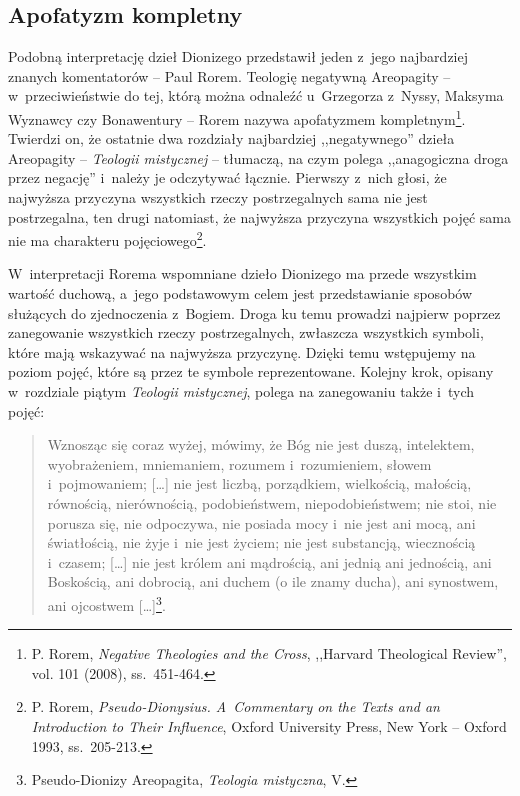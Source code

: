\subsection*{Apofatyzm kompletny}

Podobną interpretację dzieł Dionizego przedstawił jeden z~jego najbardziej znanych komentatorów -- Paul Rorem. Teologię negatywną Areopagity -- w~przeciwieństwie do tej, którą można odnaleźć u~Grzegorza z~Nyssy, Maksyma Wyznawcy czy Bonawentury -- Rorem nazywa apofatyzmem kompletnym\footnote{P. Rorem, \textit{Negative Theologies and the Cross}, ,,Harvard Theological Review'', vol. 101 (2008), ss.~451-464.}. Twierdzi on, że ostatnie dwa rozdziały najbardziej ,,negatywnego'' dzieła Areopagity -- \textit{Teologii mistycznej} -- tłumaczą, na czym polega ,,anagogiczna droga przez negację'' i~należy je odczytywać łącznie. Pierwszy z~nich głosi, że najwyższa przyczyna wszystkich rzeczy postrzegalnych sama nie jest postrzegalna, ten drugi natomiast, że najwyższa przyczyna wszystkich pojęć sama nie ma charakteru pojęciowego\footnote{P. Rorem, \textit{Pseudo-Dionysius. A~Commentary on the Texts and an Introduction to Their Influence}, Oxford University Press, New York -- Oxford 1993, ss.~205-213.}.

W~interpretacji Rorema wspomniane dzieło Dionizego ma przede wszystkim wartość duchową, a~jego podstawowym celem jest przedstawianie sposobów służących do zjednoczenia z~Bogiem. Droga ku temu prowadzi najpierw poprzez zanegowanie wszystkich rzeczy postrzegalnych, zwłaszcza wszystkich symboli, które mają wskazywać na najwyższa przyczynę. Dzięki temu wstępujemy na poziom pojęć, które są przez te symbole reprezentowane. Kolejny krok, opisany w~rozdziale piątym \textit{Teologii mistycznej}, polega na zanegowaniu także i~tych pojęć:

\begin{quote}
Wznosząc się coraz wyżej, mówimy, że Bóg nie jest duszą, intelektem, wyobrażeniem, mniemaniem, rozumem i~rozumieniem, słowem i~pojmowaniem; [\ldots] nie jest liczbą, porządkiem, wielkością, małością, równością, nierównością, podobieństwem, niepodobieństwem; nie stoi, nie porusza się, nie odpoczywa, nie posiada mocy i~nie jest ani mocą, ani światłością, nie żyje i~nie jest życiem; nie jest substancją, wiecznością i~czasem; [\ldots] nie jest królem ani mądrością, ani jednią ani jednością, ani Boskością, ani dobrocią, ani duchem (o ile znamy ducha), ani synostwem, ani ojcostwem [\ldots]\footnote{Pseudo-Dionizy Areopagita, \textit{Teologia mistyczna}, V.}.
\end{quote}

